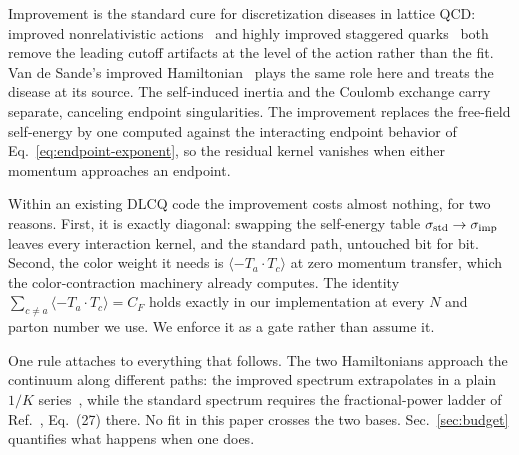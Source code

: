Improvement is the standard cure for discretization diseases in lattice
QCD: improved nonrelativistic actions~\cite{Lepage:1992tx} and highly
improved staggered quarks~\cite{Follana:2006rc} both remove the leading
cutoff artifacts at the level of the action rather than the fit.  Van de
Sande's improved Hamiltonian~\cite{vandeSande:1996mc} plays the same role
here and treats the disease at its source.  The self-induced inertia and the Coulomb exchange
carry separate, canceling endpoint singularities.  The improvement replaces
the free-field self-energy by one computed against the interacting endpoint
behavior of Eq.~\eqref{eq:endpoint-exponent}, so the residual kernel
vanishes when either momentum approaches an endpoint.

Within an existing DLCQ code the improvement costs almost nothing, for two
reasons.  First, it is exactly diagonal: swapping the self-energy table
$\sigma_{\rm std} \to \sigma_{\rm imp}$ leaves every interaction kernel,
and the standard path, untouched bit for bit.  Second, the color weight it
needs is $\langle -T_a\!\cdot\!T_c\rangle$ at zero momentum transfer, which
the color-contraction machinery already computes.  The identity
$\sum_{c\neq a}\langle -T_a\!\cdot\!T_c\rangle = C_F$ holds exactly in our
implementation at every $N$ and parton number we use.  We enforce it as a
gate rather than assume it.

One rule attaches to everything that follows.  The two Hamiltonians
approach the continuum along different paths: the improved spectrum
extrapolates in a plain $1/K$ series~\cite{vandeSande:1996mc}, while the
standard spectrum requires the fractional-power ladder of
Ref.~\cite{Hornbostel:1988fb}, Eq.~(27) there.  No fit in this paper
crosses the two bases.  Sec.~\ref{sec:budget} quantifies what happens when
one does.
